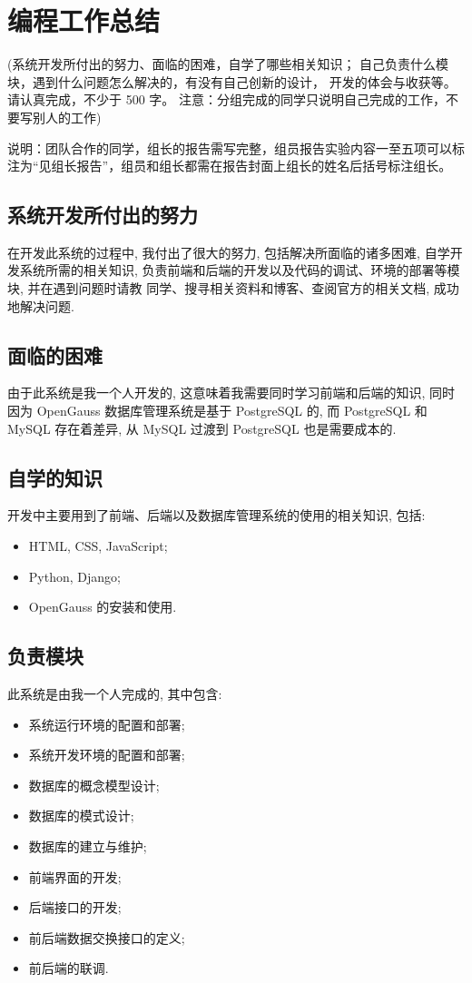 \section{编程工作总结}
(系统开发所付出的努力、面临的困难，自学了哪些相关知识；
自己负责什么模块，遇到什么问题怎么解决的，有没有自己创新的设计，
开发的体会与收获等。请认真完成，不少于 500 字。
注意：分组完成的同学只说明自己完成的工作，不要写别人的工作)

说明：团队合作的同学，组长的报告需写完整，组员报告实验内容一至五项可以标
注为``见组长报告''，组员和组长都需在报告封面上组长的姓名后括号标注组长。

\subsection{系统开发所付出的努力}
在开发此系统的过程中, 我付出了很大的努力, 包括解决所面临的诸多困难,
自学开发系统所需的相关知识,
负责前端和后端的开发以及代码的调试、环境的部署等模块, 并在遇到问题时请教
同学、搜寻相关资料和博客、查阅官方的相关文档, 成功地解决问题.

\subsection{面临的困难}
由于此系统是我一个人开发的, 这意味着我需要同时学习前端和后端的知识,
同时因为 OpenGauss 数据库管理系统是基于 PostgreSQL 的, 而 PostgreSQL 和
MySQL 存在着差异, 从 MySQL 过渡到 PostgreSQL 也是需要成本的.

\subsection{自学的知识}
开发中主要用到了前端、后端以及数据库管理系统的使用的相关知识, 包括:
\begin{itemize}
  \item HTML, CSS, JavaScript;
  \item Python, Django;
  \item OpenGauss 的安装和使用.
\end{itemize}

\subsection{负责模块}
此系统是由我一个人完成的, 其中包含:
\begin{itemize}
  \item 系统运行环境的配置和部署;
  \item 系统开发环境的配置和部署;
  \item 数据库的概念模型设计;
  \item 数据库的模式设计;
  \item 数据库的建立与维护;
  \item 前端界面的开发;
  \item 后端接口的开发;
  \item 前后端数据交换接口的定义;
  \item 前后端的联调.
\end{itemize}

